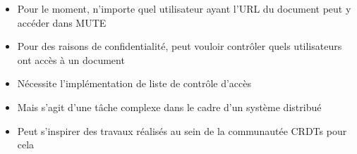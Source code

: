 \begin{itemize}
    \item Pour le moment, n'importe quel utilisateur ayant l'URL du document peut y accéder dans MUTE
    \item Pour des raisons de confidentialité, peut vouloir contrôler quels utilisateurs ont accès à un document
    \item Nécessite l'implémentation de liste de contrôle d'accès
    \item Mais s'agit d'une tâche complexe dans le cadre d'un système distribué
    \item Peut s'inspirer des travaux réalisés au sein de la communautée \acp{CRDT} \cite{2021-access-control-crdts, 2022-dist-access-control-pa} pour cela
  \end{itemize}
